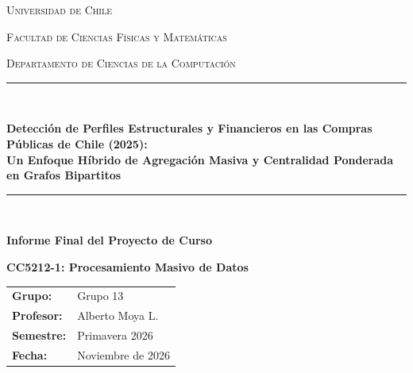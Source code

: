 \documentclass[11pt,a4paper]{article}
\begin{document}
\begin{titlepage}
    \centering
    \vspace*{1.0cm}
    {\scshape\Large Universidad de Chile \par}
    {\scshape\large Facultad de Ciencias Físicas y Matemáticas \par}
    {\scshape\large Departamento de Ciencias de la Computación \par}
    \vspace{1.2cm}
    \rule{\linewidth}{0.6mm} \\[0.4cm]
    {\huge \bfseries \color{uchileblue} Detección de Perfiles Estructurales y Financieros en las Compras Públicas de Chile (2025): \\[0.25cm]
    \Large Un Enfoque Híbrido de Agregación Masiva y Centralidad Ponderada en Grafos Bipartitos \par}
    \vspace{0.2cm}
    \rule{\linewidth}{0.6mm} \\[1.2cm]

    {\Large \textbf{Informe Final del Proyecto de Curso} \par}
    \vspace{0.3cm}
    {\large \textbf{CC5212-1: Procesamiento Masivo de Datos} \par}
    \vspace{1.2cm}

    \begin{tabular}{ll}
        \textbf{Grupo:} & Grupo 13 \\
        \textbf{Profesor:} & Alberto Moya L. \\
        \textbf{Semestre:} & Primavera 2026 \\
        \textbf{Fecha:} & Noviembre de 2026
    \end{tabular}


\end{titlepage}
\end{document}
